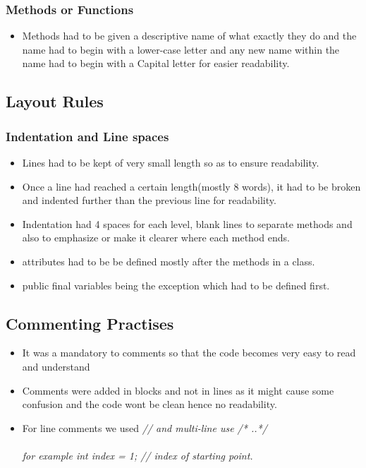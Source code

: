 \documentclass[12pt]{article}
\begin{document}
	\subsubsection{Methods or Functions}
  \begin{itemize}
 	\item Methods had to be given a descriptive name of what exactly they do and the name had to begin with a lower-case letter and any new name 	within the name had to begin with a Capital letter for easier readability.
 	\end{itemize}  
 	
 	\subsection{Layout Rules}
 	\subsubsection{Indentation and Line spaces}
	\begin{itemize}
		\item Lines had to be kept of very small length so as to ensure readability.
		\item Once a line had reached  a certain length(mostly 8 words), it had to be broken 	and 				indented further than the previous line for readability.
		\item Indentation had  4 spaces for each level, blank lines to separate methods and also to 				emphasize or make it clearer where each method ends.
		
		\item attributes had to be be defined mostly after the methods in a class.
		\item public final variables being the exception which had to be defined first.
	\end{itemize}
	
 	\subsection{Commenting Practises}
 		\begin{itemize}
		\item It was a mandatory to comments so that the code becomes very easy to read and understand
		\item Comments were added in blocks and not in lines as it might cause some confusion 						and the code wont be clean hence no readability.
		\item For line comments we used {\it // and multi-line use /* ..*/}\\\\
		{\it for example int index  = 1; // index of starting point.}\\\\
		
		\end{itemize}
\end{document}

